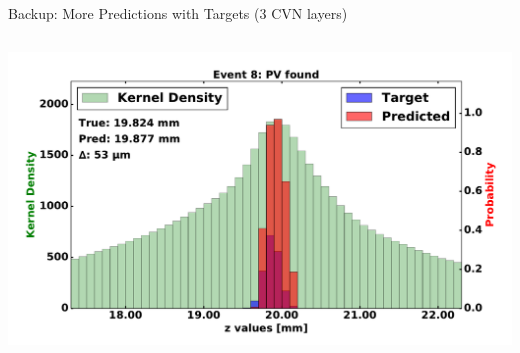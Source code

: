 \begin{frame}{Backup: More Predictions with Targets (3 CVN layers)}
\begin{columns}[c]
\begin{center}
           \includegraphics[width=1\textwidth, height=0.45\textwidth, trim=18 0 18 0]{images/120000_3layer_48.pdf}
       \end{center}
  \end{columns}
\end{frame}

